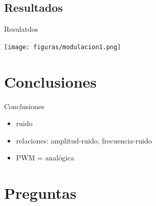 \documentclass{if-beamer}
\begin{document}
\subsection{Resultados}
\begin{frame}{Resulatdos}
    \begin{center}
    \texttt{[image: figuras/modulacion1.png]}
\end{center}{}
\end{frame}{}

\section{Conclusiones}
\begin{frame}{Conclusiones}
\begin{itemize}
    \item ruido
    \item relaciones: amplitud-ruido, frecuencia-ruido
    \item PWM = analógica 
    
\end{itemize}{}

\end{frame}{}

\section{Preguntas}
\end{document}
